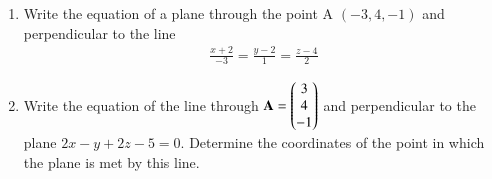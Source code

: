 \renewcommand{\theequation}{\theenumi}
\renewcommand{\thefigure}{\theenumi}
\begin{enumerate}[label=\thesubsection.\arabic*.,ref=\thesubsection.\theenumi]
%

\item Write the equation of a plane through the point A $\left(-3, 4, -1 \right)$ and perpendicular to the line 
\begin{align}
\frac{x+2}{-3} = \frac{y - 2}{1} = \frac{z-4}{2} \label{eq:solutions/4/50/3/eq1.1}
\end{align}
%
\solution

%
\item Write the equation of the line through $\mathbf{A} = \begin{pmatrix}3 \\4\\-1\end{pmatrix}$ and perpendicular to the plane $2x-y+2z-5=0$. Determine the coordinates of the point in which the plane is met by this line.   
%
\\
\solution

\end{enumerate}



